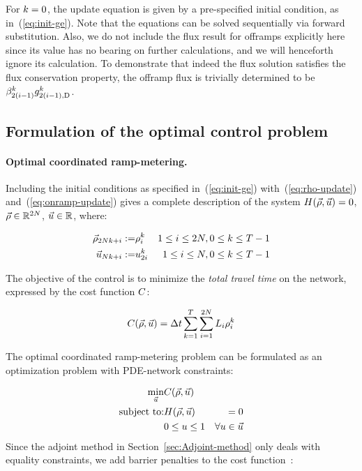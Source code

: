 For $k=0$, the update equation is given by a pre-specified initial
condition, as in~(\ref{eq:init-ge}). Note that the equations can
be solved sequentially via forward substitution. Also, we do not include
the flux result for offramps explicitly here since its value has no
bearing on further calculations, and we will henceforth ignore its
calculation. To demonstrate that indeed the flux solution satisfies
the flux conservation property, the offramp flux is trivially determined
to be $\splitratio_{2\left(\link-1\right)}^{\tind}\fout{2\left(\link-1\right)}{\tind}$.


\subsection{Formulation of the optimal control problem}


\paragraph{Optimal coordinated ramp-metering.}

Including the initial conditions as specified in~(\ref{eq:init-ge})
with~(\ref{eq:rho-update}) and~(\ref{eq:onramp-update}) gives
a complete description of the system $\sys\left(\state,\control\right)=0$,
$\vec{\rho}\in\mathbb{R}^{2N}$, $\vec{u}\in\mathbb{R}$, where:

\begin{eqnarray*}
\vec{\rho}_{2Nk+i}:= & \rho_{i}^{k} & 1\le i\le2N,0\le k\le T-1\\
\vec{u}_{Nk+i}:= & u_{2i}^{k} & 1\le i\le N,0\le k\le T-1
\end{eqnarray*}


The objective of the control is to minimize the \emph{total travel
time }on the network, expressed by the cost function $C$:

\[
\cost\left(\state,\control\right)=\Delta t\sum_{k=1}^{T}\sum_{i=1}^{2\nlinks}L_{i}\densitydiscrete{\link}{\tind}
\]


The optimal coordinated ramp-metering problem can be formulated as
an optimization problem with PDE-network constraints:

\begin{eqnarray}
\min_{\control} & \cost\left(\state,\control\right)\label{eq:full}\\
\text{subject to:} & \sys\left(\state,\control\right) & =0\nonumber \\
 & 0\le\convar\le1 & \forall\convar\in\control\nonumber 
\end{eqnarray}
Since the adjoint method in Section~\ref{sec:Adjoint-method} only
deals with equality constraints, we add barrier penalties to the cost
function~\cite{Boyd2010,Bayen2006}:

